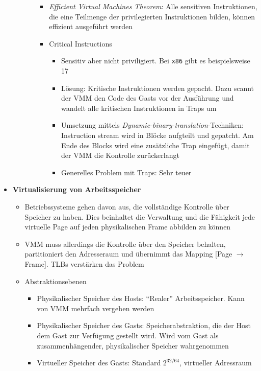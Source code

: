 \begin{itemize}
\begin{itemize}
\begin{itemize}
\begin{itemize}
\begin{itemize}
				\end{itemize}
				\item \textit{Efficient Virtual Machines Theorem}: Alle sensitiven Instruktionen, die eine Teilmenge der privilegierten Instruktionen bilden, können effizient ausgeführt werden
				\item Critical Instructions
				\begin{itemize}
					\item Sensitiv aber nicht priviligiert. Bei \texttt{x86} gibt es beispielsweise 17
					\item Lösung: Kritische Instruktionen werden gepacht. Dazu scannt der VMM den Code des Gasts vor der Ausführung und wandelt alle kritischen Instruktionen in Traps um
					\item Umsetzung mittels \textit{Dynamic-binary-translation}-Techniken: Instruction stream wird in Blöcke aufgteilt und gepatcht. Am Ende des Blocks wird eine zusätzliche Trap eingefügt, damit der VMM die Kontrolle zurückerlangt
					\item Generelles Problem mit Traps: Sehr teuer
				\end{itemize}
			\end{itemize}
		\end{itemize}
	\end{itemize}
	\item \textbf{Virtualisierung von Arbeitsspeicher}
	\begin{itemize}
		\item Betriebssysteme gehen davon aus, die vollständige Kontrolle über Speicher zu haben. Dies beinhaltet die Verwaltung und die Fähigkeit jede virtuelle Page auf jeden physikalischen Frame abbilden zu können
		\item VMM muss allerdings die Kontrolle über den Speicher behalten, partitioniert den Adresseraum und übernimmt das Mapping [Page \(\rightarrow\) Frame]. TLBs verstärken das Problem
		\item Abstraktionsebenen
		\begin{itemize}
			\item Physikalischer Speicher des Hosts: "`Realer"' Arbeitsspeicher. Kann von VMM mehrfach vergeben werden
			\item Physikalischer Speicher des Gasts: Speicherabstraktion, die der Host dem Gast zur Verfügung gestellt wird. Wird vom Gast als zusammenhängender, physikalischer Speicher wahrgenommen
			\item Virtueller Speicher des Gasts: Standard \(2^{32/64}\), virtueller Adressraum
		\end{itemize}

\end{itemize}
\end{itemize}
